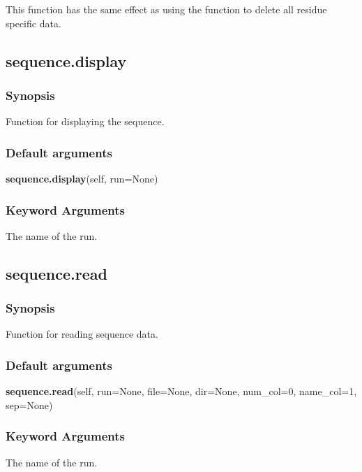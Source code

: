 This function has the same effect as using the 
 function to delete all residue
specific data.


\newpage

\subsection{sequence.display}


\subsubsection{Synopsis}

Function for displaying the sequence.

\subsubsection{Default arguments}

\textsf{\textbf{sequence.display}(self, run=None)}


\subsubsection{Keyword Arguments}

  The name of the run.


\newpage

\subsection{sequence.read}


\subsubsection{Synopsis}

Function for reading sequence data.

\subsubsection{Default arguments}

\textsf{\textbf{sequence.read}(self, run=None, file=None, dir=None, num\_col=0, name\_col=1, sep=None)}


\subsubsection{Keyword Arguments}

  The name of the run.

